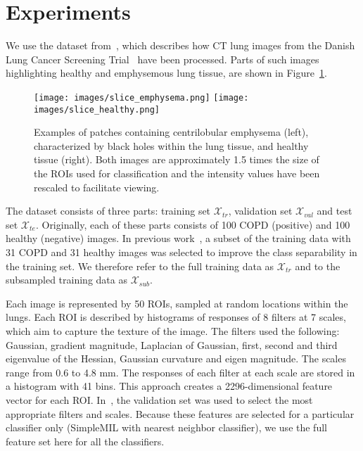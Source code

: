 \documentclass[10pt,conference,a4paper]{IEEEtran}
\begin{document}



\section{Experiments}\label{sec:experiments}

We use the dataset from~\cite{sorensen2012texture}, which describes how CT lung images from the Danish Lung Cancer Screening Trial~\cite{pedersen2009danish} have been processed. Parts of such images highlighting healthy and emphysemous lung tissue, are shown in Figure~\ref{fig:images}.

\begin{figure}[ht]
 \centering
  \texttt{[image: images/slice\_emphysema.png]}
  \texttt{[image: images/slice\_healthy.png]}

 \caption[]{Examples of patches containing centrilobular emphysema (left), characterized by black holes within the lung tissue, and healthy tissue (right). Both images are approximately 1.5 times the size of the ROIs used for classification and the intensity values have been rescaled to facilitate viewing.}
 \label{fig:images}
\end{figure}


The dataset consists of three parts: training set $\mathcal{X}_{tr}$, validation set $\mathcal{X}_{val}$ and test set $\mathcal{X}_{te}$. Originally, each of these parts consists of 100 COPD (positive) and 100 healthy (negative) images. In previous work~\cite{sorensen2012texture}, a subset of the training data with 31 COPD and 31 healthy images was selected to improve the class separability in the training set. We therefore refer to the full training data as $\mathcal{X}_{tr}$ and to the subsampled training data as $\mathcal{X}_{sub}$.

Each image is represented by 50 ROIs, sampled at random locations within the lungs. Each ROI is described by histograms of responses of 8 filters at 7 scales, which aim to capture the texture of the image. The filters used the following: Gaussian, gradient magnitude, Laplacian of Gaussian, first, second and third eigenvalue of the Hessian, Gaussian curvature and eigen magnitude. The scales range from 0.6 to 4.8 mm. The responses of each filter at each scale are stored in a histogram with 41 bins. This approach creates a 2296-dimensional feature vector for each ROI. In~\cite{sorensen2012texture}, the validation set was used to select the most appropriate filters and scales. Because these features are selected for a particular classifier only (SimpleMIL with nearest neighbor classifier), we use the full feature set here for all the classifiers.
\end{document}
